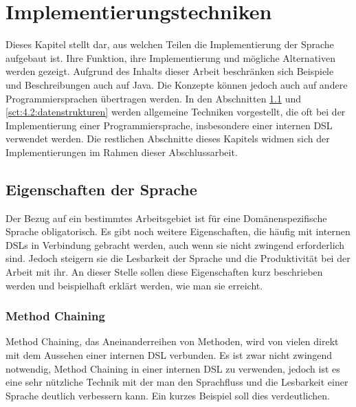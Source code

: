 
\chapter{Implementierungstechniken}\label{chp:4:implementierungstechniken}
Dieses Kapitel stellt dar, aus welchen Teilen die Implementierung der Sprache aufgebaut ist. Ihre Funktion, ihre Implementierung und mögliche Alternativen werden gezeigt. Aufgrund des Inhalts dieser Arbeit beschränken sich Beispiele und Beschreibungen auch auf Java. Die Konzepte können jedoch auch auf andere Programmiersprachen übertragen werden. In den Abschnitten \ref{sct:4.1:eigenschaften} und \ref{sct:4.2:datenstrukturen} werden allgemeine Techniken vorgestellt, die oft bei der Implementierung einer Programmiersprache, insbesondere einer internen DSL verwendet werden. Die restlichen Abschnitte dieses Kapitels widmen sich der Implementierungen im Rahmen dieser Abschlussarbeit.

\section{Eigenschaften der Sprache}\label{sct:4.1:eigenschaften}
Der Bezug auf ein bestimmtes Arbeitsgebiet ist für eine Domänenspezifische Sprache obligatorisch. Es gibt noch weitere Eigenschaften, die häufig mit internen DSLs in Verbindung gebracht werden, auch wenn sie nicht zwingend erforderlich sind. Jedoch steigern sie die Lesbarkeit der Sprache und die Produktivität bei der Arbeit mit ihr. An dieser Stelle sollen diese Eigenschaften kurz beschrieben werden und beispielhaft  erklärt werden, wie man sie erreicht.

\subsection{Method Chaining}\label{ssct:4.1.1:chaining}
Method Chaining, das Aneinanderreihen von Methoden, wird von vielen direkt mit dem Aussehen einer internen DSL verbunden. Es ist zwar nicht zwingend notwendig, Method Chaining in einer internen DSL zu verwenden, jedoch ist es eine sehr nützliche Technik mit der man den Sprachfluss und die Lesbarkeit einer Sprache deutlich verbessern kann\cite{book:fowlerDSL}. Ein kurzes Beispiel soll dies verdeutlichen.

